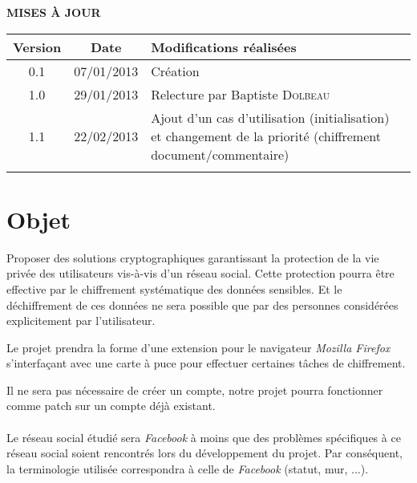 \documentclass[a4paper,11pt,french]{article}
\begin{document}
\makeFirstPage
\clearpage

\vspace*{1cm}
\begin{center}
\textbf{\huge{MISES À JOUR}}\\
\vspace*{3cm}
	\begin{tabularx}{16cm}{|c|c|X|}
	\hline
	\bfseries{Version} & \bfseries{Date} & \bfseries{Modifications réalisées}\\
	\hline
	0.1 & 07/01/2013 & Création\\
	\hline
    1.0 & 29/01/2013 & Relecture par Baptiste \textsc{Dolbeau}\\
	\hline
    1.1 & 22/02/2013 & Ajout d'un cas d'utilisation (initialisation) et 
    changement de la priorité (chiffrement document/commentaire) \\
	\hline
	&&\\
	\hline
	\end{tabularx}
\end{center}

\clearpage
\tableofcontents
\clearpage

\section{Objet}
\renewcommand\labelitemi{\textbullet} %
\renewcommand\labelitemii{$\circ$} %
Proposer des solutions cryptographiques garantissant la protection de la vie 
privée des utilisateurs vis-à-vis d'un réseau social. Cette protection pourra
être effective par le chiffrement systématique des données sensibles. Et
le déchiffrement de ces données ne sera possible que par des personnes
considérées explicitement par l'utilisateur.


Le projet prendra la forme d'une extension pour le navigateur 
\emph{Mozilla Firefox}
s'interfaçant avec une carte à puce pour effectuer certaines tâches de 
chiffrement.

Il ne sera pas nécessaire de créer un compte, notre projet pourra fonctionner 
comme patch sur un compte déjà existant.

\paragraph{}
Le réseau social étudié sera \emph{Facebook} à moins que des problèmes spécifiques
à ce réseau social soient rencontrés lors du développement du projet.
Par conséquent, la terminologie utilisée correspondra à celle de \emph{Facebook} 
(statut, mur, ...).
\end{document}
